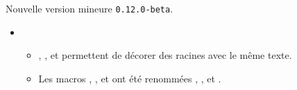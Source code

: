 Nouvelle version mineure \verb+0.12.0-beta+.

\begin{itemize}[itemsep=.5em]
    \item {}

    \begin{itemize}[itemsep=.5em]
		\item {}, ,  et  permettent de décorer des racines avec le même texte.

        \item Les macros , ,  et  ont été renommées , ,  et .
    \end{itemize}
\end{itemize}


\separation
